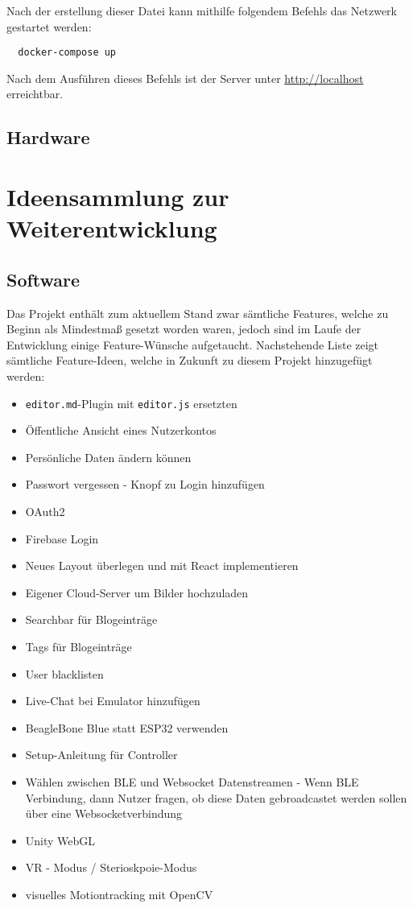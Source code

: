 \documentclass[paper=a4,12pt]{scrreprt}
\begin{document}
Nach der erstellung dieser Datei kann mithilfe folgendem Befehls das Netzwerk gestartet werden:\newline

\begin{lstlisting}
  docker-compose up
\end{lstlisting}

Nach dem Ausführen dieses Befehls ist der Server unter \url{http://localhost} erreichtbar.\pagebreak

\section{Hardware}


\chapter{Ideensammlung zur Weiterentwicklung}
\section{Software}

Das Projekt enthält zum aktuellem Stand zwar sämtliche Features, welche zu Beginn als Mindestmaß gesetzt worden waren, jedoch sind im Laufe der Entwicklung einige Feature-Wünsche aufgetaucht. Nachstehende Liste zeigt sämtliche Feature-Ideen, welche in Zukunft zu diesem Projekt hinzugefügt werden:\newline

\begin{itemize}
  \item \texttt{editor.md}-Plugin mit \texttt{editor.js} ersetzten
  \item Öffentliche Ansicht eines Nutzerkontos
  \item Persönliche Daten ändern können
  \item Passwort vergessen - Knopf zu Login hinzufügen
  \item OAuth2
  \item Firebase Login
  \item Neues Layout überlegen und mit React implementieren
  \item Eigener Cloud-Server um Bilder hochzuladen
  \item Searchbar für Blogeinträge
  \item Tags für Blogeinträge
  \item User blacklisten
  \item Live-Chat bei Emulator hinzufügen
  \item BeagleBone Blue statt ESP32 verwenden
  \item Setup-Anleitung für Controller
  \item Wählen zwischen BLE und Websocket Datenstreamen - Wenn BLE Verbindung, dann Nutzer fragen, ob diese Daten gebroadcastet werden sollen über eine Websocketverbindung
  \item Unity WebGL
  \item VR - Modus / Sterioskpoie-Modus
  \item visuelles Motiontracking mit OpenCV
\end{itemize}
\end{document}
